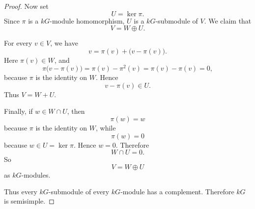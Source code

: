 \begin{proof}
    Now set
    \[
        U=\ker \pi.
    \]
    Since \(\pi\) is a \(kG\)-module homomorphism, \(U\) is a \(kG\)-submodule of
    \(V\). We claim that
    \[
        V=W\oplus U.
    \]

    For every \(v\in V\), we have
    \[
        v=\pi(v)+\bigl(v-\pi(v)\bigr).
    \]
    Here \(\pi(v)\in W\), and
    \[
        \pi\bigl(v-\pi(v)\bigr)
        =
        \pi(v)-\pi^2(v)
        =
        \pi(v)-\pi(v)
        =
        0,
    \]
    because \(\pi\) is the identity on \(W\). Hence
    \[
        v-\pi(v)\in U.
    \]
    Thus \(V=W+U\).

    Finally, if \(w\in W\cap U\), then
    \[
        \pi(w)=w
    \]
    because \(\pi\) is the identity on \(W\), while
    \[
        \pi(w)=0
    \]
    because \(w\in U=\ker\pi\). Hence \(w=0\). Therefore
    \[
        W\cap U=0.
    \]
    So
    \[
        V=W\oplus U
    \]
    as \(kG\)-modules.

    Thus every \(kG\)-submodule of every \(kG\)-module has a complement. Therefore
    \(kG\) is semisimple.
\end{proof}
